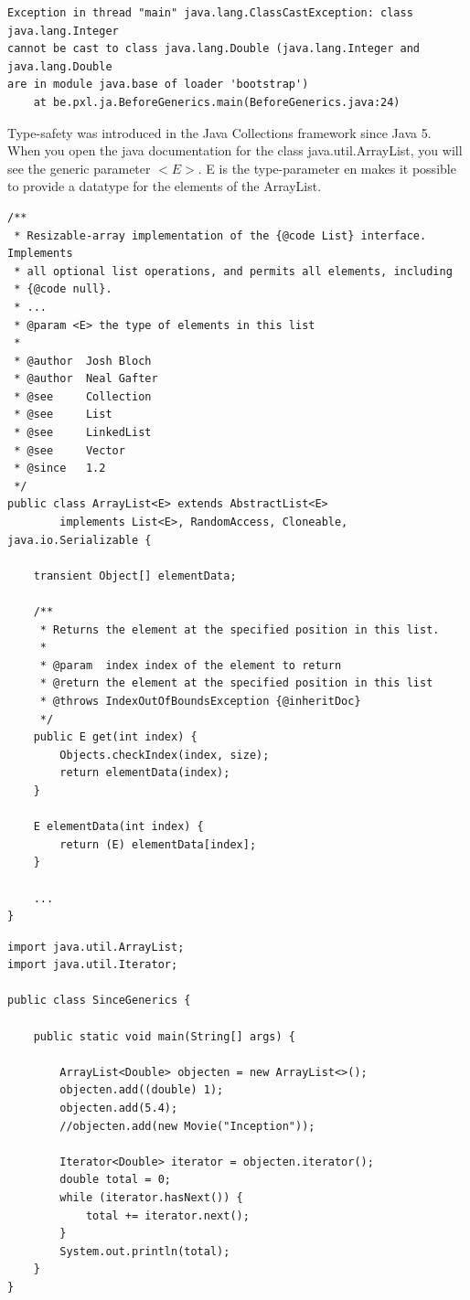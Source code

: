 \begin{verbatim}
Exception in thread "main" java.lang.ClassCastException: class java.lang.Integer 
cannot be cast to class java.lang.Double (java.lang.Integer and java.lang.Double 
are in module java.base of loader 'bootstrap')
	at be.pxl.ja.BeforeGenerics.main(BeforeGenerics.java:24)
\end{verbatim}

Type-safety was introduced in the Java Collections framework since Java 5. 
When you open the java documentation for the class java.util.ArrayList, you will see the generic parameter  $<E>$. 
E is the type-parameter en makes it possible to provide a datatype for the elements of the ArrayList. 

\begin{lstlisting}
/**
 * Resizable-array implementation of the {@code List} interface.  Implements
 * all optional list operations, and permits all elements, including
 * {@code null}. 
 * ...
 * @param <E> the type of elements in this list
 *
 * @author  Josh Bloch
 * @author  Neal Gafter
 * @see     Collection
 * @see     List
 * @see     LinkedList
 * @see     Vector
 * @since   1.2
 */
public class ArrayList<E> extends AbstractList<E>
        implements List<E>, RandomAccess, Cloneable, java.io.Serializable {
        
    transient Object[] elementData;
    
    /**
     * Returns the element at the specified position in this list.
     *
     * @param  index index of the element to return
     * @return the element at the specified position in this list
     * @throws IndexOutOfBoundsException {@inheritDoc}
     */
    public E get(int index) {
        Objects.checkIndex(index, size);
        return elementData(index);
    }
    
    E elementData(int index) {
        return (E) elementData[index];
    }
    
    ...
}
\end{lstlisting}

\begin{lstlisting}
import java.util.ArrayList;
import java.util.Iterator;

public class SinceGenerics {

	public static void main(String[] args) {

		ArrayList<Double> objecten = new ArrayList<>();
		objecten.add((double) 1);
		objecten.add(5.4);
		//objecten.add(new Movie("Inception"));

		Iterator<Double> iterator = objecten.iterator();
		double total = 0;
		while (iterator.hasNext()) {
			total += iterator.next();
		}
		System.out.println(total);
	}
}
\end{lstlisting}


